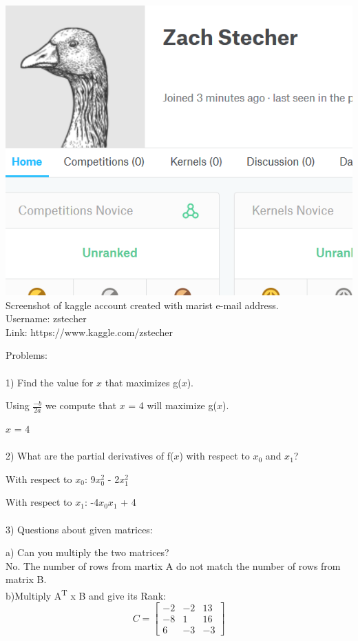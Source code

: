 \documentclass [12pt] {article}
\begin{document}
\includegraphics{kaggle}
Screenshot of kaggle account created with marist e-mail address.\\
Username: zstecher\\
Link: https://www.kaggle.com/zstecher
\newpage

Problems:\\
\\
1) Find the value for $x$ that maximizes g($x$).

Using \( \frac{-b}{2a} \) we compute that $x$ = 4 will maximize g($x$).

$x$ = 4\\
\\
2) What are the partial derivatives of f($x$) with respect to $x_0$ and $x_1$?

With respect to $x_0$: 9$x_0^2$ - 2$x_1^2$

With respect to $x_1$: -4$x_0x_1$ + 4\\
\\
3) Questions about given matrices:

a) Can you multiply the two matrices?\\
No. The number of rows from martix A do not match the number of rows from matrix B.\\

b)Multiply A\textsuperscript{T} x B and give its Rank:\\

\[
	C=
	\begin{bmatrix}
	-2 & -2 & 13 \\ 
	-8 & 1 & 16 \\ 
	6 & -3 & -3		
	\end{bmatrix}
\]
\end{document}
